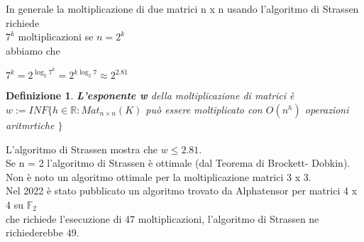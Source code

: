 \documentclass[a4paper,12pt]{article}
\theoremstyle{def}
\newtheorem*{definition}{Definizione}
\theoremstyle{prop}
\theoremstyle{esempio}
\theoremstyle{dimostrazione}
\theoremstyle{teo}
\theoremstyle{osservazione}
\begin{document}
In generale la moltiplicazione di due matrici n x n usando l'algoritmo di Strassen richiede\\
\(7^k\) moltiplicazioni se \(n = 2^k\)\\
abbiamo che
\begin{center}
    \(7^k = 2^{\log_2 7^k}=2^{k \log_2 7} \approx 2^{2.81}\)
\end{center}

\begin{definition}
    \textbf{L'esponente w} della moltiplicazione di matrici è\\
    \(w := INF\{ h \in \mathbb{R} : Mat_{n \times n}(K)\) può essere moltiplicato con \(O(n^h)\) operazioni aritmrtiche \(\}\)\\
\end{definition}

\vspace{\baselineskip} L'algoritmo di Strassen mostra che \(w \leq 2.81\).\\
Se n = 2 l'algoritmo di Strassen è ottimale (dal Teorema di Brockett- Dobkin).\\
Non è noto un algoritmo ottimale per la moltiplicazione matrici 3 x 3.\\
Nel 2022 è stato pubblicato un algoritmo trovato da Alphatensor per matrici 4 x 4 su \(\mathbb{F}_2\)\\
che richiede l'esecuzione di 47 moltiplicazioni, l'algoritmo di Strassen ne richiederebbe 49.\\
\end{document}
